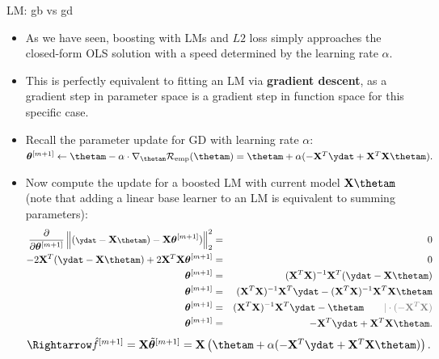 
\begin{vbframe}{LM: gb vs gd}

\footnotesize

\begin{itemize}
  \item As we have seen, boosting with LMs and $L2$
  loss simply approaches the closed-form OLS solution with a speed determined by
  the learning rate $\alpha$.
  \item This is perfectly equivalent to fitting an LM via
  \textbf{gradient descent}, as a gradient step in parameter space is a
  gradient step in function space for this specific case.
  \item Recall the parameter update for GD with learning rate $\alpha$:
  $\thetab^{[m+1]} \leftarrow \thetam - \alpha \cdot \nabla_{\thetam}
  \riske(\thetam) =
  \thetam + \alpha (-\Xmat^T \ydat + \Xmat^T\Xmat \thetam).$ \\
  \item Now compute the update for a boosted LM with current model
  $\Xmat \thetam$ (note that adding a linear base learner to an LM is
  equivalent to summing parameters):
  \begin{eqnarray*}
    \footnotesize
    \frac{\partial}{\partial \thetab^{[m+1]}}
    \left \| (\ydat - \Xmat \thetam) - \Xmat \thetab^{[m+1]}) \right \|^2_2
    &=& 0 \\
    -2\Xmat^T (\ydat - \Xmat \thetam) + 2\Xmat^T\Xmat
    \thetab^{[m+1]} &=& 0 \\
    \thetab^{[m+1]} &=& (\Xmat^T\Xmat)^{-1} \Xmat^T
    (\ydat - \Xmat \thetam) \\
    \thetab^{[m+1]} &=& (\Xmat^T\Xmat)^{-1} \Xmat^T \ydat
    - (\Xmat^T\Xmat)^{-1} \Xmat^T \Xmat \thetam \\
    \thetab^{[m+1]} &=& (\Xmat^T\Xmat)^{-1} \Xmat^T \ydat
    - \thetam  \quad \quad \textcolor{gray}{\rvert \cdot (-\Xmat^T\Xmat)}
    \\
    \thetab^{[m+1]} &=& - \Xmat^T \ydat + \Xmat^T\Xmat
    \thetam.
  \end{eqnarray*}
  $\Rightarrow \fh^{[m+1]} = \Xmat \tilde \thetab^{[m+1]} =
  \Xmat \left( \thetam + \alpha (-\Xmat^T \ydat +
  \Xmat^T\Xmat \thetam) \right).$
\end{itemize}


\end{vbframe}


\endlecture

